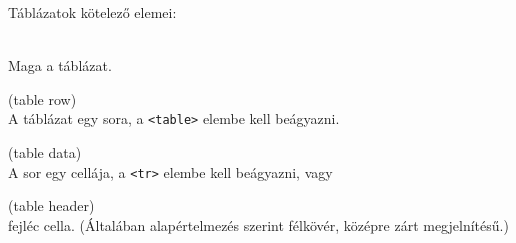\begin{frame}
  Táblázatok kötelező elemei:
  \begin{description}[m]
    \item[\texttt{<table>}] \hfill \\ Maga a táblázat.
    \item[\texttt{<tr>}] (table row) \hfill \\ A táblázat egy sora, a \texttt{<table>} elembe kell beágyazni.
    \item[\texttt{<td>}] (table data) \hfill \\ A sor egy cellája, a \texttt{<tr>} elembe kell beágyazni, vagy
    \item[\texttt{<th>}] (table header) \hfill \\ fejléc cella. (Általában alapértelmezés szerint félkövér, középre zárt megjelnítésű.)
  \end{description}
\end{frame}

